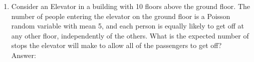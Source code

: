 \documentclass{article}
\begin{document}
\begin{enumerate}
\begin{enumerate}
\begin{align*}
                                   &= 2\left(1 - \int^{1}_{a} \int^{x-a}_{0}dydx\right)\\
                                   &= 2\left(1 - \int^{1}_{a} x-adx \right) \\
                                   &= 2\left(1 - \left(\frac{1}{2}x^2 - ax \Big|^{1}_{a}\right)\right) \\
                                   &= 2\left(1 - \left(\frac{1}{2} - a - \left(\frac{1}{2}a^2 - a^2\right)\right)\right) \\
                                   &= 2\left(1 - \left(\frac{1}{2} - a + \frac{1}{2}a^2\right)\right)\\
                                   &= 2\left(-\frac{1}{2}+a-\frac{1}{2}a^2\right) \\
                                   &= -1 + 2a - a^2
                \end{align*}
                and the pdf is then obtained from the derivative of the cdf
                \begin{align*}
                    f_{|X-Y|}(a) &= (-1+2a-a^2)da \\
                                 &= \fbox{$2 - 2a$}
                \end{align*}
            \item   Compute $E[|X-Y|]$.
                \\Answer:\\
                Given the pdf of $-2+2a$, the expected value would then be
                \begin{align*}
                    E[f_{|X-Y|(a)}] &= \int^{1}_{0} a(2-2a) da\\
                                    &= a^2 - \frac{2}{3}a^3 \Big|^{1}_{0} \\
                                    &= 1 - \frac{2}{3} = \fbox{$\frac{1}{3}$}
                \end{align*}
        \end{enumerate}
    \clearpage
    \item   Consider an Elevator in a building with 10 floors above the ground floor. The number of people entering the 
            elevator on the ground floor is a Poisson random variable with mean 5, and each person is equally likely to get off
            at any other floor, independently of the others. What is the expected number of stops the elevator will make to
            allow all of the passengers to get off?
        \\Answer:\\

\end{enumerate}
\end{document}
